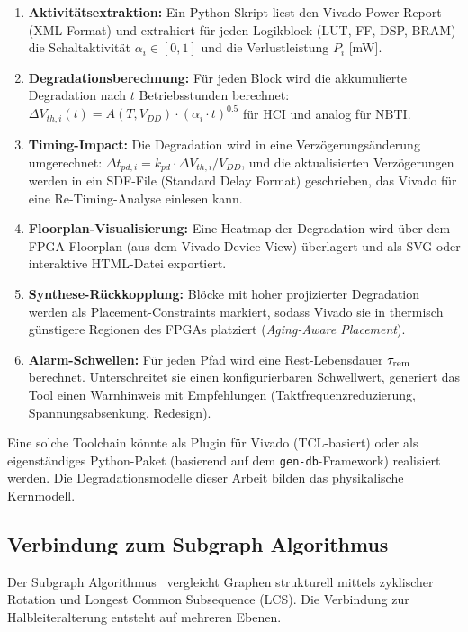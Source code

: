 ﻿\documentclass[a4paper,12pt]{article}
\theoremstyle{definition}
\begin{document}
\begin{enumerate}
	\item \textbf{Aktivitätsextraktion:} Ein Python-Skript liest den Vivado
	      Power Report (XML-Format) und extrahiert für jeden Logikblock
	      (LUT, FF, DSP, BRAM) die Schaltaktivität $\alpha_i \in [0,1]$
	      und die Verlustleistung $P_i$ [mW].
	\item \textbf{Degradationsberechnung:} Für jeden Block wird die
	      akkumulierte Degradation nach $t$ Betriebsstunden berechnet:
	      $\Delta V_{th,i}(t) = A(T, V_{DD}) \cdot (\alpha_i \cdot t)^{0.5}$
	      für HCI und analog für NBTI.
	\item \textbf{Timing-Impact:} Die Degradation wird in eine Verzögerungsänderung
	      umgerechnet: $\Delta t_{pd,i} = k_{pd} \cdot \Delta V_{th,i} / V_{DD}$,
	      und die aktualisierten Verzögerungen werden in ein SDF-File (Standard
	      Delay Format) geschrieben, das Vivado für eine Re-Timing-Analyse einlesen kann.
	\item \textbf{Floorplan-Visualisierung:} Eine Heatmap der Degradation wird
	      über dem FPGA-Floorplan (aus dem Vivado-Device-View) überlagert und als
	      SVG oder interaktive HTML-Datei exportiert.
	\item \textbf{Synthese-Rückkopplung:} Blöcke mit hoher projizierter Degradation
	      werden als Placement-Constraints markiert, sodass Vivado sie in thermisch
	      günstigere Regionen des FPGAs platziert (\emph{Aging-Aware Placement}).
	\item \textbf{Alarm-Schwellen:} Für jeden Pfad wird eine Rest-Lebensdauer
	      $\tau_{\rm rem}$ berechnet. Unterschreitet sie einen konfigurierbaren
	      Schwellwert, generiert das Tool einen Warnhinweis mit Empfehlungen
	      (Taktfrequenzreduzierung, Spannungsabsenkung, Redesign).
\end{enumerate}

Eine solche Toolchain könnte als Plugin für Vivado (TCL-basiert) oder als
eigenständiges Python-Paket (basierend auf dem \texttt{gen-db}-Framework)
realisiert werden. Die Degradationsmodelle dieser Arbeit bilden das
physikalische Kernmodell.

\subsection{Verbindung zum Subgraph Algorithmus}
\label{sub:subgraph}

Der Subgraph Algorithmus~\cite{epp2026} vergleicht Graphen strukturell mittels
zyklischer Rotation und Longest Common Subsequence (LCS). Die Verbindung zur
Halbleiteralterung entsteht auf mehreren Ebenen.
\end{document}

